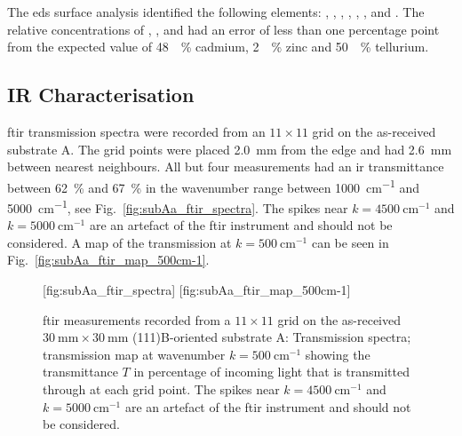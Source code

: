 The \ac{eds} surface analysis identified the following elements: , , , , , , and . The relative concentrations of , , and  had an error of less than one percentage point from the expected value of \SI{48}{\atomic\percent} cadmium, \SI{2}{\atomic\percent} zinc and \SI{50}{\atomic\percent} tellurium. %
\subsection{IR Characterisation}

\Ac{ftir} transmission spectra were recorded from an $11\times11$ grid on the as-received substrate A. The grid points were placed \SI{2.0}{\milli\metre} from the edge and had \SI{2.6}{\milli\metre} between nearest neighbours. All but four measurements had an \ac{ir} transmittance between \SI{62}{\percent} and \SI{67}{\percent} in the wavenumber range between \SI{1000}{\centi\metre^{-1}} and \SI{5000}{\centi\metre^{-1}}, see Fig.~\ref{fig:subAa_ftir_spectra}. The spikes near $k=\SI{4500}{\centi\metre^{-1}}$ and $k=\SI{5000}{\centi\metre^{-1}}$ are an artefact of the \ac{ftir} instrument and should not be considered. A map of the transmission at $k=\SI{500}{\centi\metre^{-1}}$ can be seen in Fig.~\ref{fig:subAa_ftir_map_500cm-1}.

\begin{figure}[htbp]
    \centering
    [fig:subAa_ftir_spectra]
    \hfill
    [fig:subAa_ftir_map_500cm-1]
    \caption[\Ac{ftir} measurements of the as-received substrate A.]{\Acf{ftir} measurements recorded from a $11\times11$ grid on the as-received $\SI{30}{\milli\metre}\times\SI{30}{\milli\metre}$ (111)B-oriented substrate A:  Transmission spectra;  transmission map at wavenumber $k=\SI{500}{\centi\metre^{-1}}$ showing the transmittance $T$ in percentage of incoming light that is transmitted through at each grid point. The spikes near $k=\SI{4500}{\centi\metre^{-1}}$ and $k=\SI{5000}{\centi\metre^{-1}}$ are an artefact of the \ac{ftir} instrument and should not be considered.}
\end{figure}

